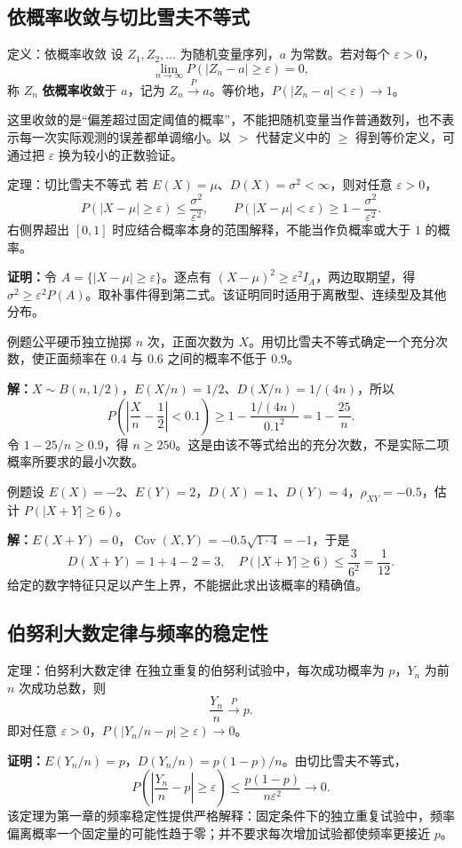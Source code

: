 \documentclass[UTF8,fontset=none,zihao=-4,a4paper]{ctexart}
\newcommand{\term}[1]{\textbf{#1}}
\newcommand{\example}[1]{\begin{infobox}{例题}#1\end{infobox}}
\newcommand{\solution}{\par\noindent\textbf{解：}}
\newcommand{\proof}{\par\noindent\textbf{证明：}}
\begin{document}
\subsection{依概率收敛与切比雪夫不等式}
\begin{infobox}{定义：依概率收敛}
设 $Z_1,Z_2,\ldots$ 为随机变量序列，$a$ 为常数。若对每个 $\varepsilon>0$，
\[
\lim_{n\to\infty}P(|Z_n-a|\ge\varepsilon)=0,
\]
称 $Z_n$ \term{依概率收敛}于 $a$，记为 $Z_n\xrightarrow{P}a$。等价地，$P(|Z_n-a|<\varepsilon)\to1$。
\end{infobox}
这里收敛的是“偏差超过固定阈值的概率”，不能把随机变量当作普通数列，也不表示每一次实际观测的误差都单调缩小。以 $>$ 代替定义中的 $\ge$ 得到等价定义，可通过把 $\varepsilon$ 换为较小的正数验证。
\begin{infobox}{定理：切比雪夫不等式}
若 $E(X)=\mu$、$D(X)=\sigma^2<\infty$，则对任意 $\varepsilon>0$，
\[
P(|X-\mu|\ge\varepsilon)\le\frac{\sigma^2}{\varepsilon^2},\qquad
P(|X-\mu|<\varepsilon)\ge1-\frac{\sigma^2}{\varepsilon^2}.
\]
右侧界超出 $[0,1]$ 时应结合概率本身的范围解释，不能当作负概率或大于 $1$ 的概率。
\end{infobox}
\proof 令 $A=\{|X-\mu|\ge\varepsilon\}$。逐点有 $(X-\mu)^2\ge\varepsilon^2 I_A$，两边取期望，得 $\sigma^2\ge\varepsilon^2P(A)$。取补事件得到第二式。该证明同时适用于离散型、连续型及其他分布。
\example{公平硬币独立抛掷 $n$ 次，正面次数为 $X$。用切比雪夫不等式确定一个充分次数，使正面频率在 $0.4$ 与 $0.6$ 之间的概率不低于 $0.9$。}
\solution $X\sim B(n,1/2)$，$E(X/n)=1/2$、$D(X/n)=1/(4n)$，所以
\[
P\left(\left|\frac Xn-\frac12\right|<0.1\right)
\ge1-\frac{1/(4n)}{0.1^2}=1-\frac{25}{n}.
\]
令 $1-25/n\ge0.9$，得 $n\ge250$。这是由该不等式给出的充分次数，不是实际二项概率所要求的最小次数。
\example{设 $E(X)=-2$、$E(Y)=2$，$D(X)=1$、$D(Y)=4$，$\rho_{XY}=-0.5$，估计 $P(|X+Y|\ge6)$。}
\solution $E(X+Y)=0$，$\operatorname{Cov}(X,Y)=-0.5\sqrt{1\cdot4}=-1$，于是
\[
D(X+Y)=1+4-2=3,\quad
P(|X+Y|\ge6)\le\frac3{6^2}=\frac1{12}.
\]
给定的数字特征只足以产生上界，不能据此求出该概率的精确值。

\subsection{伯努利大数定律与频率的稳定性}
\begin{infobox}{定理：伯努利大数定律}
在独立重复的伯努利试验中，每次成功概率为 $p$，$Y_n$ 为前 $n$ 次成功总数，则
\[
\frac{Y_n}{n}\xrightarrow{P}p.
\]
即对任意 $\varepsilon>0$，$P(|Y_n/n-p|\ge\varepsilon)\to0$。
\end{infobox}
\proof $E(Y_n/n)=p$，$D(Y_n/n)=p(1-p)/n$。由切比雪夫不等式，
\[
P\left(\left|\frac{Y_n}{n}-p\right|\ge\varepsilon\right)
\le\frac{p(1-p)}{n\varepsilon^2}\longrightarrow0.
\]
该定理为第一章的频率稳定性提供严格解释：固定条件下的独立重复试验中，频率偏离概率一个固定量的可能性趋于零；并不要求每次增加试验都使频率更接近 $p$。
\end{document}

